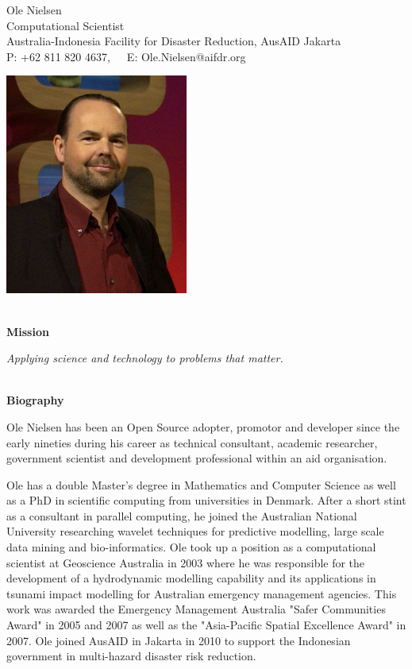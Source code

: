\documentclass[11pt,a4paper]{article}
\begin{document}
\begin{center}
  Ole Nielsen \\
  Computational Scientist \\
  Australia-Indonesia Facility for Disaster Reduction, AusAID Jakarta \\
  P: +62 811 820 4637,\ \ \ E: Ole.Nielsen@aifdr.org
\end{center}
\begin{center}
\includegraphics[width=60mm,keepaspectratio=true]{ole.jpg}
\end{center}


\begin{center}
  \hrulefill \\
  {\bf Mission} \\[-0.2cm]
  \hrulefill
\end{center}
\emph{Applying science and technology to problems that matter.}
\begin{center}
  \hrulefill \\
  {\bf Biography} \\[-0.2cm]
  \hrulefill
\end{center}


Ole Nielsen has been an Open Source adopter, promotor and developer
since the early nineties during his career as technical consultant,
academic researcher, government scientist and development
professional within an aid organisation.

Ole has a double Master's degree in Mathematics and Computer Science
as well as a PhD in scientific computing from universities in Denmark.
After a short stint as a consultant in parallel computing, he joined
the Australian National University researching wavelet techniques for
predictive modelling, large scale data mining and bio-informatics. Ole
took up a position as a computational scientist at Geoscience
Australia in 2003 where he was responsible for the development of a
hydrodynamic modelling capability and its applications in tsunami
impact modelling for Australian emergency management agencies. This
work was awarded the Emergency Management Australia "Safer Communities
Award" in 2005 and 2007 as well as the "Asia-Pacific Spatial
Excellence Award" in 2007. Ole joined AusAID in
Jakarta in 2010 to support the Indonesian government in multi-hazard disaster
risk reduction.
\end{document}
